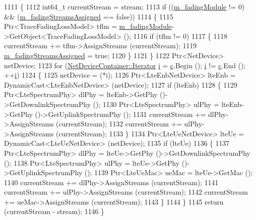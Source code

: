 \begin{DoxyCode}
1111 \{
1112   int64\_t currentStream = stream;
1113   \textcolor{keywordflow}{if} ((\hyperlink{classns3_1_1LteHelper_ab986df63e68ba63cb4d2c95bdbf9f47a}{m\_fadingModule} != 0) && (\hyperlink{classns3_1_1LteHelper_a88e2bb1e3428772135954bf05c17c34e}{m\_fadingStreamsAssigned} == \textcolor{keyword}{false}))
1114     \{
1115       Ptr<TraceFadingLossModel> tflm = \hyperlink{classns3_1_1LteHelper_ab986df63e68ba63cb4d2c95bdbf9f47a}{m\_fadingModule}->GetObject<TraceFadingLossModel> ();
1116       \textcolor{keywordflow}{if} (tflm != 0)
1117         \{
1118           currentStream += tflm->AssignStreams (currentStream);
1119           \hyperlink{classns3_1_1LteHelper_a88e2bb1e3428772135954bf05c17c34e}{m\_fadingStreamsAssigned} = \textcolor{keyword}{true};
1120         \}
1121     \}
1122   Ptr<NetDevice> netDevice;
1123   \textcolor{keywordflow}{for} (\hyperlink{classns3_1_1NetDeviceContainer_a45709bb572f975569ed985fa89b132f8}{NetDeviceContainer::Iterator} \hyperlink{bernuolliDistribution_8m_a6f6ccfcf58b31cb6412107d9d5281426}{i} = \hyperlink{lte_2model_2fading-traces_2fading__trace__generator_8m_ae0323a9039add2978bf5b49550572c7c}{c}.Begin (); 
      \hyperlink{bernuolliDistribution_8m_a6f6ccfcf58b31cb6412107d9d5281426}{i} != \hyperlink{lte_2model_2fading-traces_2fading__trace__generator_8m_ae0323a9039add2978bf5b49550572c7c}{c}.End (); ++\hyperlink{bernuolliDistribution_8m_a6f6ccfcf58b31cb6412107d9d5281426}{i})
1124     \{
1125       netDevice = (*i);
1126       Ptr<LteEnbNetDevice> lteEnb = DynamicCast<LteEnbNetDevice> (netDevice);
1127       \textcolor{keywordflow}{if} (lteEnb)
1128         \{
1129           Ptr<LteSpectrumPhy> dlPhy = lteEnb->GetPhy ()->GetDownlinkSpectrumPhy ();
1130           Ptr<LteSpectrumPhy> ulPhy = lteEnb->GetPhy ()->GetUplinkSpectrumPhy ();
1131           currentStream += dlPhy->AssignStreams (currentStream);
1132           currentStream += ulPhy->AssignStreams (currentStream);
1133         \}
1134       Ptr<LteUeNetDevice> lteUe = DynamicCast<LteUeNetDevice> (netDevice);
1135       \textcolor{keywordflow}{if} (lteUe)
1136         \{
1137           Ptr<LteSpectrumPhy> dlPhy = lteUe->GetPhy ()->GetDownlinkSpectrumPhy ();
1138           Ptr<LteSpectrumPhy> ulPhy = lteUe->GetPhy ()->GetUplinkSpectrumPhy ();
1139           Ptr<LteUeMac> ueMac = lteUe->GetMac ();
1140           currentStream += dlPhy->AssignStreams (currentStream);
1141           currentStream += ulPhy->AssignStreams (currentStream);
1142           currentStream += ueMac->AssignStreams (currentStream);
1143         \}
1144     \}
1145   \textcolor{keywordflow}{return} (currentStream - stream);
1146 \}
\end{DoxyCode}



